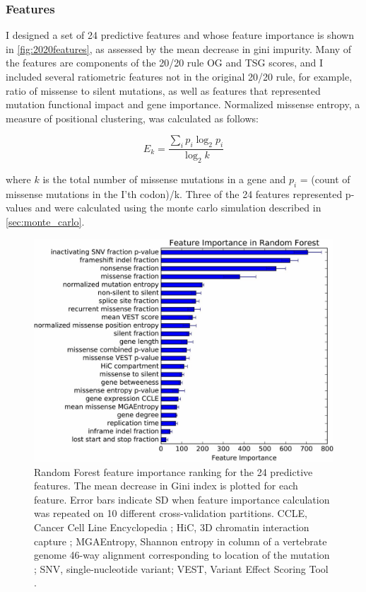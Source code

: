 \subsubsection{Features}

I designed a set of 24 predictive features and whose feature importance is shown in \autoref{fig:2020features}, as assessed by the mean decrease in gini impurity. Many of the features are components of the 20/20 rule OG and TSG scores, and I included several ratiometric features not in the original 20/20 rule, for example, ratio of missense to silent mutations, as well as features that represented mutation functional impact and gene importance. Normalized missense entropy, a measure of positional clustering, was calculated as follows:

\begin{equation}
E_k = \frac{\sum_i{p_i\log_2{p_i}}}{\log_2{k}}
\end{equation}

where $k$ is the total number of missense mutations in a gene and $p_i$ = (count of missense mutations in the I'th codon)/k. Three of the 24 features represented p-values and were calculated using the monte carlo simulation described in \autoref{sec:monte_carlo}.

\begin{figure}
  \centering
  \makeatletter
  \let\@currsize\normalsize
  \includegraphics[width=0.9\linewidth]{figures/chapter3/feature_importance.jpg}
  \caption[Random Forest feature importance ranking for the 24 predictive features.]{Random Forest feature importance ranking for the 24 predictive features. The mean decrease in Gini index is plotted for each feature. Error bars indicate SD when feature importance calculation was repeated on 10 different cross-validation partitions. CCLE, Cancer Cell Line Encyclopedia \cite{RN13}; HiC, 3D chromatin interaction capture \cite{RN13}; MGAEntropy, Shannon entropy in column of a vertebrate genome 46-way alignment corresponding to location of the mutation \cite{RN90}; SNV, single-nucleotide variant; VEST, Variant Effect Scoring Tool \cite{RN30}.}
  \label{fig:2020features}
\end{figure}

